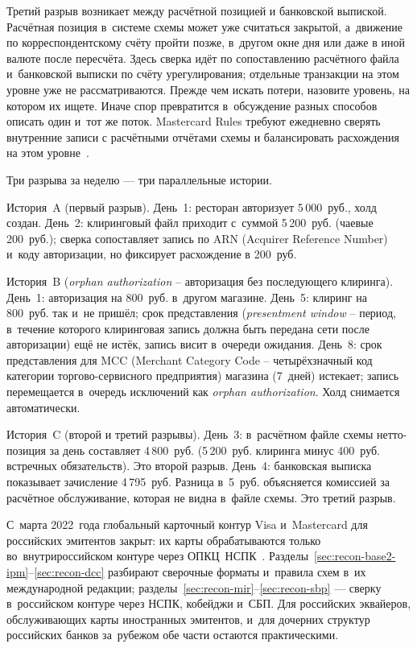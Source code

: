 Третий разрыв возникает между расчётной позицией и банковской выпиской.
Расчётная позиция в~системе схемы может уже считаться закрытой, а~движение по
корреспондентскому счёту пройти позже, в~другом окне дня или даже в
иной валюте после пересчёта. Здесь сверка идёт по сопоставлению
расчётного файла и~банковской выписки по счёту урегулирования;
отдельные транзакции на этом уровне уже не рассматриваются. Прежде чем искать
потери, назовите уровень, на котором их ищете. Иначе спор
превратится в~обсуждение разных способов описать один и~тот же поток.
Mastercard Rules требуют ежедневно сверять внутренние записи с
расчётными отчётами схемы и балансировать расхождения на этом уровне~\cite{mc-rules}.

Три разрыва за неделю — три параллельные истории.

История~A (первый разрыв). День~1: ресторан авторизует 5\,000~руб.,
холд создан. День~2: клиринговый файл приходит с~суммой 5\,200~руб.
(чаевые 200~руб.); сверка сопоставляет запись по ARN (Acquirer
Reference Number) и~коду авторизации, но фиксирует расхождение в 200~руб.

История~B (\textit{orphan authorization} -- авторизация без последующего
клиринга). День~1: авторизация на 800~руб. в~другом магазине. День~5:
клиринг на 800~руб. так и~не пришёл; срок представления (\textit{presentment
window} -- период, в~течение которого клиринговая запись должна быть
передана сети после авторизации) ещё не истёк, запись висит в~очереди
ожидания. День~8: срок представления для MCC (Merchant Category Code --
четырёхзначный код категории торгово-сервисного предприятия) магазина
(7~дней) истекает; запись перемещается в~очередь исключений как
\textit{orphan authorization}. Холд снимается автоматически.

История~C (второй и третий разрывы). День~3: в~расчётном файле схемы
нетто-позиция за день составляет 4\,800~руб. (5\,200~руб. клиринга
минус 400~руб. встречных обязательств). Это второй разрыв. День~4:
банковская выписка показывает зачисление 4\,795~руб. Разница в~5~руб.
объясняется комиссией за расчётное обслуживание, которая не видна
в~файле схемы. Это третий разрыв.

С~марта 2022~года глобальный карточный контур Visa и~Mastercard для российских эмитентов закрыт: их карты обрабатываются только во~внутрироссийском контуре через ОПКЦ~НСПК~\cite{cbr-ps,nspk-mir-rules}. Разделы~\ref{sec:recon-base2-ipm}--\ref{sec:recon-dcc} разбирают сверочные форматы и~правила схем в~их международной редакции; разделы~\ref{sec:recon-mir}--\ref{sec:recon-sbp} --- сверку в~российском контуре через НСПК, кобейджи и~СБП. Для российских эквайеров, обслуживающих карты иностранных эмитентов, и~для дочерних структур российских банков за~рубежом обе части остаются практическими.

